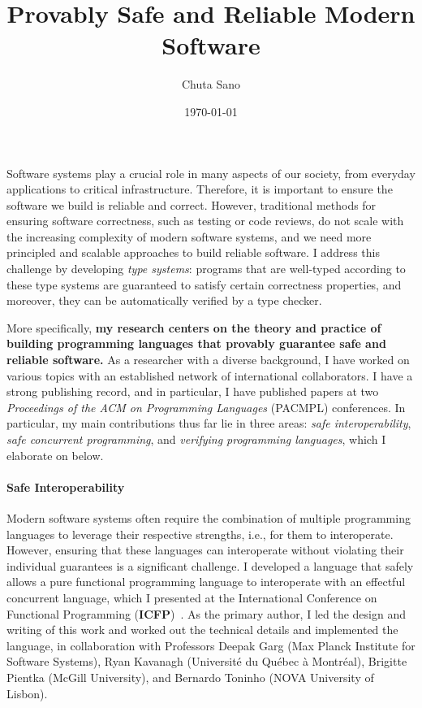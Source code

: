 \documentclass[11pt]{article}
\begin{document}
\title{Provably Safe and Reliable Modern Software}
\author{Chuta Sano}
\date{\today}
\maketitle


Software systems play a crucial role in many aspects of our society, from everyday applications to critical infrastructure.
Therefore, it is important to ensure the software we build is reliable and correct.
However, traditional methods for ensuring software correctness, such as testing or code reviews, do not scale with the increasing complexity of modern software systems, and we need more principled and scalable approaches to build reliable software.
I address this challenge by developing \emph{type systems}:
programs that are well-typed according to these type systems are guaranteed to satisfy certain correctness properties, and moreover, they can be automatically verified by a type checker.

More specifically, \textbf{my research centers on the theory and practice of building programming languages that provably guarantee safe and reliable software.}
As a researcher with a diverse background, I have worked on various topics with an established network of international collaborators. I have a strong publishing record, and in particular, I have published papers at two \emph{Proceedings of the ACM on Programming Languages} (PACMPL) conferences.
In particular, my main contributions thus far lie in three areas: \emph{safe interoperability}, \emph{safe concurrent programming}, and \emph{verifying programming languages}, which I elaborate on below.

\paragraph{Safe Interoperability}
Modern software systems often require the combination of multiple programming languages to leverage their respective strengths, i.e., for them to interoperate.
However, ensuring that these languages can interoperate without violating their individual guarantees is a significant challenge.
I developed a language that safely allows a pure functional programming language to interoperate with an effectful concurrent language, which I presented at the International Conference on Functional Programming (\textbf{ICFP})~\cite{Sano25icfp}.
As the primary author, I led the design and writing of this work and worked out the technical details and implemented the language,
in collaboration with Professors Deepak Garg (Max Planck Institute for Software Systems),
Ryan Kavanagh (Université du Québec à Montréal),
Brigitte Pientka (McGill University), and
Bernardo Toninho (NOVA University of Lisbon).
\end{document}
